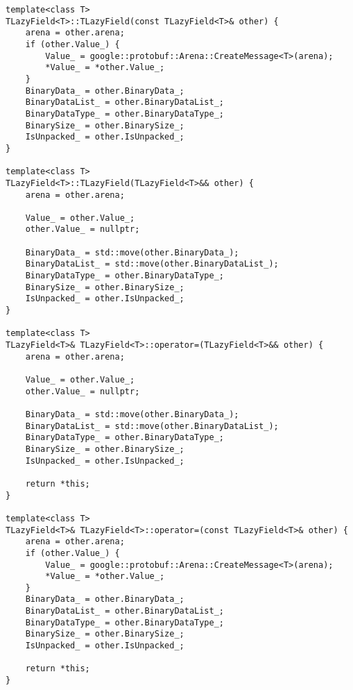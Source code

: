 \begin{lstlisting}[style=CodeListing]
template<class T>
TLazyField<T>::TLazyField(const TLazyField<T>& other) {
    arena = other.arena;
    if (other.Value_) {
        Value_ = google::protobuf::Arena::CreateMessage<T>(arena);
        *Value_ = *other.Value_;
    }
    BinaryData_ = other.BinaryData_;
    BinaryDataList_ = other.BinaryDataList_;
    BinaryDataType_ = other.BinaryDataType_;
    BinarySize_ = other.BinarySize_;
    IsUnpacked_ = other.IsUnpacked_;
}

template<class T>
TLazyField<T>::TLazyField(TLazyField<T>&& other) {
    arena = other.arena;

    Value_ = other.Value_;
    other.Value_ = nullptr;

    BinaryData_ = std::move(other.BinaryData_);
    BinaryDataList_ = std::move(other.BinaryDataList_);
    BinaryDataType_ = other.BinaryDataType_;
    BinarySize_ = other.BinarySize_;
    IsUnpacked_ = other.IsUnpacked_;
}

template<class T>
TLazyField<T>& TLazyField<T>::operator=(TLazyField<T>&& other) {
    arena = other.arena;

    Value_ = other.Value_;
    other.Value_ = nullptr;

    BinaryData_ = std::move(other.BinaryData_);
    BinaryDataList_ = std::move(other.BinaryDataList_);
    BinaryDataType_ = other.BinaryDataType_;
    BinarySize_ = other.BinarySize_;
    IsUnpacked_ = other.IsUnpacked_;

    return *this;
}

template<class T>
TLazyField<T>& TLazyField<T>::operator=(const TLazyField<T>& other) {
    arena = other.arena;
    if (other.Value_) {
        Value_ = google::protobuf::Arena::CreateMessage<T>(arena);
        *Value_ = *other.Value_;
    }
    BinaryData_ = other.BinaryData_;
    BinaryDataList_ = other.BinaryDataList_;
    BinaryDataType_ = other.BinaryDataType_;
    BinarySize_ = other.BinarySize_;
    IsUnpacked_ = other.IsUnpacked_;

    return *this;
}
\end{lstlisting}
\pagebreak

